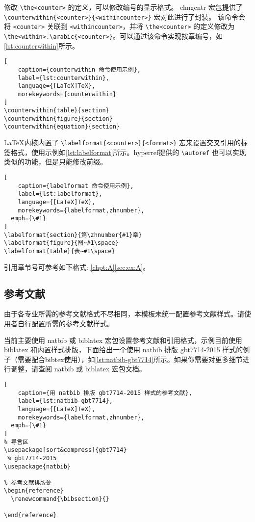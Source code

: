 \documentclass{nkuthesis}
\begin{document}
修改 \verb|\the<counter>| 的定义，可以修改编号的显示格式。 chngcntr 宏包提供了 \verb|\counterwithin{<counter>}{<withincounter>}| 宏对此进行了封装。 该命令会将 \verb|<counter>| 关联到 \verb|<withincounter>|，并将 \verb|\the<counter>| 的定义修改为 \verb|\the<within>.\arabic{<counter>}|。可以通过该命令实现按章编号，如\ref{lst:counterwithin}所示。

\begin{lstlisting}[
	caption={counterwithin 命令使用示例},
	label={lst:counterwithin},
	language={[LaTeX]TeX},
	morekeywords={counterwithin}
]
\counterwithin{table}{section}
\counterwithin{figure}{section}
\counterwithin{equation}{section}
\end{lstlisting}

\LaTeX 内核内置了 \verb|\labelformat{<counter>}{<format>}| 宏来设置交叉引用的标签格式，使用示例如\ref{lst:labelformat}所示。hyperref提供的 \verb|\autoref| 也可以实现类似的功能，但是只能修改前缀。

\begin{lstlisting}[
	caption={labelformat 命令使用示例},
	label={lst:labelformat},
	language={[LaTeX]TeX},
	morekeywords={labelformat,zhnumber},
  emph={\#1}
]
\labelformat{section}{第\zhnumber{#1}章}
\labelformat{figure}{图~#1\space}
\labelformat{table}{表~#1\space}
\end{lstlisting}

引用章节号可参考如下格式: \ref{chpt:A}\ref{sec:ex:A}。

\subsection{参考文献} \label{manual:ref}

由于各专业所需的参考文献格式不尽相同，本模板未统一配置参考文献样式。请使用者自行配置所需的参考文献样式。

当前主要使用 natbib 或 biblatex 宏包设置参考文献和引用格式，示例目前使用 biblatex 和内置样式排版，下面给出一个使用 natbib 排版 gbt7714-2015 样式的例子（需要配合bibtex使用），如\ref{lst:natbib-gbt7714}所示。如果你需要对更多细节进行调整，请查阅 natbib 或 biblatex 宏包文档。

\begin{lstlisting}[
	caption={用 natbib 排版 gbt7714-2015 样式的参考文献},
	label={lst:natbib-gbt7714},
	language={[LaTeX]TeX},
	morekeywords={labelformat,zhnumber},
  emph={\#1}
]
% 导言区
\usepackage[sort&compress]{gbt7714}
 % gbt7714-2015
\usepackage{natbib}

% 参考文献排版处
\begin{reference}
  \renewcommand{\bibsection}{}
  
\end{reference}
\end{lstlisting}
\end{document}

